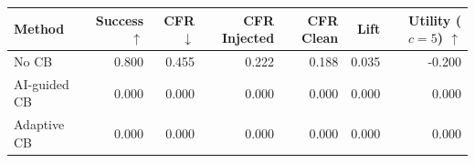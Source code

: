 \begin{tabular}{lrrrrrr}
\toprule
Method & Success $\uparrow$ & CFR $\downarrow$ & CFR Injected & CFR Clean & Lift & Utility ($c=5$) $\uparrow$ \\
\midrule
No CB & 0.800 & 0.455 & 0.222 & 0.188 & 0.035 & -0.200 \\
AI-guided CB & 0.000 & 0.000 & 0.000 & 0.000 & 0.000 & 0.000 \\
Adaptive CB & 0.000 & 0.000 & 0.000 & 0.000 & 0.000 & 0.000 \\
\bottomrule
\end{tabular}
